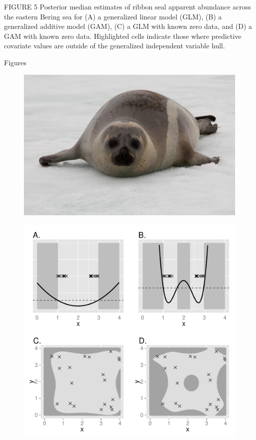 \documentclass[12pt,english]{article}
\begin{document}
\begin{spacing}{1.9}
FIGURE 5  Posterior median estimates of ribbon seal apparent abundance across the eastern Bering sea for (A) a generalized linear model (GLM), (B) a generalized additive model (GAM), (C) a GLM with known zero data, and (D) a GAM with known zero data.  Highlighted cells indicate those where predictive covariate values are outside of the generalized independent variable hull.

\clearpage
\centerline{\sc Figures}



\begin{figure}[!h]
\begin{center}
\includegraphics[width=6in]{ribbon}
\end{center}
\caption{ }
\label{fig:ribbon}
\end{figure}

\begin{figure}[!h]
\begin{center}
\includegraphics[width=6in]{IVH_simple2.pdf}
\end{center}
\caption{ }
\label{fig:IVH}
\end{figure}


\end{spacing}
\end{document}
